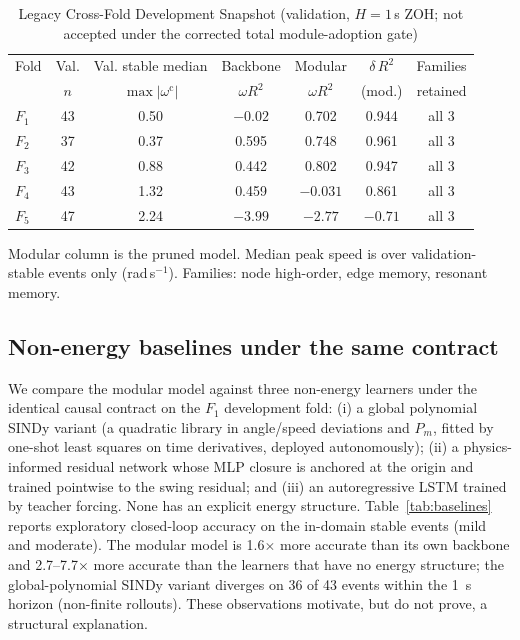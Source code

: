 \documentclass[journal]{IEEEtran}
\begin{document}
\begin{table}[!t]
\caption{Legacy Cross-Fold Development Snapshot (validation, $H{=}1$\,s ZOH;
not accepted under the corrected total module-adoption gate)}
\label{tab:select}
\centering
\footnotesize
\setlength{\tabcolsep}{4pt}
\begin{tabular}{lcccccc}
\toprule
Fold & Val. & Val. stable median & Backbone & Modular & $\delta\,R^2$ & Families \\
     & $n$  & $\max|\omega^{\mathrm c}|$ & $\omega R^2$ & $\omega R^2$ & (mod.) & retained \\
\midrule
$F_1$ & 43 & 0.50 & $-0.02$ & 0.702 & 0.944 & all 3 \\
$F_2$ & 37 & 0.37 & 0.595 & 0.748 & 0.961 & all 3 \\
$F_3$ & 42 & 0.88 & 0.442 & 0.802 & 0.947 & all 3 \\
$F_4$ & 43 & 1.32 & 0.459 & $-0.031$ & 0.861 & all 3 \\
$F_5$ & 47 & 2.24 & $-3.99$ & $-2.77$ & $-0.71$ & all 3 \\
\bottomrule
\end{tabular}
\vspace{0.2em}
\footnotesize Modular column is the pruned model. Median peak speed is over
validation-stable events only (rad\,s$^{-1}$). Families: node high-order, edge
memory, resonant memory.
\end{table}

\subsection{Non-energy baselines under the same contract}
\label{sec:baselines}
We compare the modular model against three non-energy learners under the
identical causal contract on the $F_1$ development fold: (i) a global
polynomial SINDy variant (a quadratic library in angle/speed deviations and
$P_m$, fitted by one-shot least squares on time derivatives, deployed
autonomously); (ii) a physics-informed residual network whose MLP closure is
anchored at the origin and trained pointwise to the swing residual; and (iii)
    an autoregressive LSTM trained by teacher forcing. None has an explicit
    energy structure. Table~\ref{tab:baselines} reports exploratory closed-loop accuracy on the
in-domain stable events (mild and moderate). The modular model is 1.6$\times$
more accurate than its own backbone and 2.7--7.7$\times$ more accurate than the
learners that have no energy structure; the global-polynomial SINDy variant
diverges on 36 of 43 events within the 1~s horizon (non-finite rollouts). These
observations motivate, but do not prove, a structural explanation.
\end{document}
